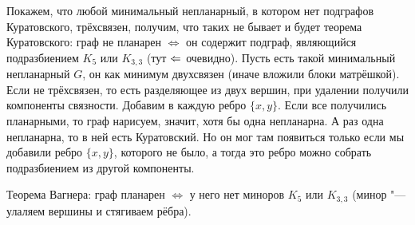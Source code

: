 	Покажем, что любой минимальный непланарный, в котором нет подграфов Куратовского, трёхсвязен, получим, что таких не бывает и будет теорема Куратовского:
	граф не планарен $\iff$ он содержит подграф, являющийся подразбиением $K_5$ или $K_{3,3}$
	(тут $\Leftarrow$ очевидно).
	Пусть есть такой минимальный непланарный $G$, он как минимум двухсвязен (иначе вложили блоки матрёшкой).
	Если не трёхсвязен, то есть разделяющее из двух вершин, при удалении получили компоненты связности.
	Добавим в каждую ребро $\{x, y\}$.
	Если все получились планарными, то граф нарисуем, значит, хотя бы одна непланарна.
	А раз одна непланарна, то в ней есть Куратовский.
	Но он мог там появиться только если мы добавили ребро $\{x,y\}$, которого не было,
	а тогда это ребро можно собрать подразбиением из другой компоненты.

	Теорема Вагнера: граф планарен $\iff$ у него нет миноров $K_5$ или $K_{3,3}$ (минор "--- улаляем вершины и стягиваем рёбра).
